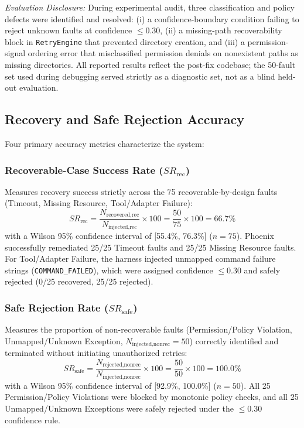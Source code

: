 \documentclass[conference]{IEEEtran}
\begin{document}
\textit{Evaluation Disclosure:} During experimental audit, three classification and policy defects were identified and resolved: (i) a confidence-boundary condition failing to reject unknown faults at confidence $\le 0.30$, (ii) a missing-path recoverability block in \texttt{RetryEngine} that prevented directory creation, and (iii) a permission-signal ordering error that misclassified permission denials on nonexistent paths as missing directories. All reported results reflect the post-fix codebase; the 50-fault set used during debugging served strictly as a diagnostic set, not as a blind held-out evaluation.

\subsection{Recovery and Safe Rejection Accuracy}
Four primary accuracy metrics characterize the system:

\subsubsection{Recoverable-Case Success Rate ($SR_{\text{rec}}$)}
Measures recovery success strictly across the 75 recoverable-by-design faults (Timeout, Missing Resource, Tool/Adapter Failure):
\begin{equation}
SR_{\text{rec}} = \frac{N_{\text{recovered,rec}}}{N_{\text{injected,rec}}} \times 100 = \frac{50}{75} \times 100 = 66.7\%
\end{equation}
with a Wilson 95\% confidence interval of [55.4\%, 76.3\%] ($n=75$). Phoenix successfully remediated 25/25 Timeout faults and 25/25 Missing Resource faults. For Tool/Adapter Failure, the harness injected unmapped command failure strings (\texttt{COMMAND\_FAILED}), which were assigned confidence $\le 0.30$ and safely rejected (0/25 recovered, 25/25 rejected).

\subsubsection{Safe Rejection Rate ($SR_{\text{safe}}$)}
Measures the proportion of non-recoverable faults (Permission/Policy Violation, Unmapped/Unknown Exception, $N_{\text{injected,nonrec}} = 50$) correctly identified and terminated without initiating unauthorized retries:
\begin{equation}
SR_{\text{safe}} = \frac{N_{\text{rejected,nonrec}}}{N_{\text{injected,nonrec}}} \times 100 = \frac{50}{50} \times 100 = 100.0\%
\end{equation}
with a Wilson 95\% confidence interval of [92.9\%, 100.0\%] ($n=50$). All 25 Permission/Policy Violations were blocked by monotonic policy checks, and all 25 Unmapped/Unknown Exceptions were safely rejected under the $\le 0.30$ confidence rule.
\end{document}

